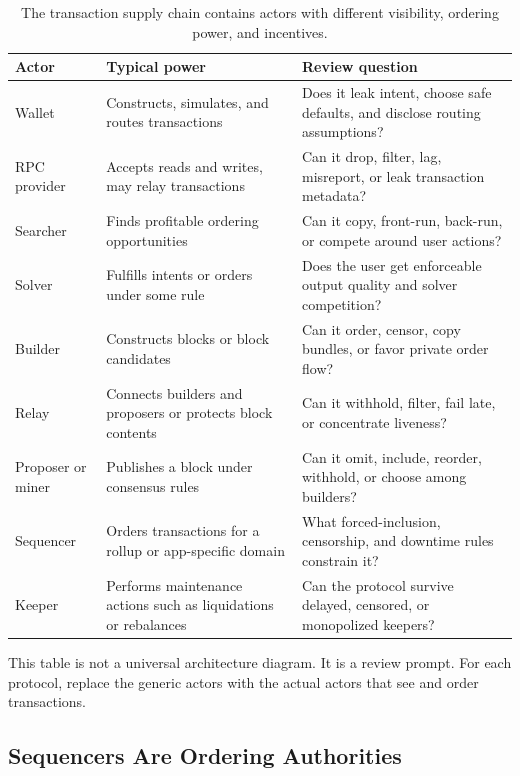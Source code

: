 \begin{table}[htbp]
\centering
\small
\renewcommand{\arraystretch}{1.16}
\begin{tabularx}{\textwidth}{@{}>{\RaggedRight\arraybackslash}p{}>{\RaggedRight\arraybackslash}p{}X@{}}
\toprule
Actor & Typical power & Review question \\
\midrule
Wallet & Constructs, simulates, and routes transactions & Does it leak intent, choose safe defaults, and disclose routing assumptions? \\
RPC provider & Accepts reads and writes, may relay transactions & Can it drop, filter, lag, misreport, or leak transaction metadata? \\
Searcher & Finds profitable ordering opportunities & Can it copy, front-run, back-run, or compete around user actions? \\
Solver & Fulfills intents or orders under some rule & Does the user get enforceable output quality and solver competition? \\
Builder & Constructs blocks or block candidates & Can it order, censor, copy bundles, or favor private order flow? \\
Relay & Connects builders and proposers or protects block contents & Can it withhold, filter, fail late, or concentrate liveness? \\
Proposer or miner & Publishes a block under consensus rules & Can it omit, include, reorder, withhold, or choose among builders? \\
Sequencer & Orders transactions for a rollup or app-specific domain & What forced-inclusion, censorship, and downtime rules constrain it? \\
Keeper & Performs maintenance actions such as liquidations or rebalances & Can the protocol survive delayed, censored, or monopolized keepers? \\
\bottomrule
\end{tabularx}
\caption{The transaction supply chain contains actors with different visibility, ordering power, and incentives.}
\end{table}

This table is not a universal architecture diagram. It is a review prompt. For each protocol, replace the generic actors with the actual actors that see and order transactions.

\subsection{Sequencers Are Ordering Authorities}

